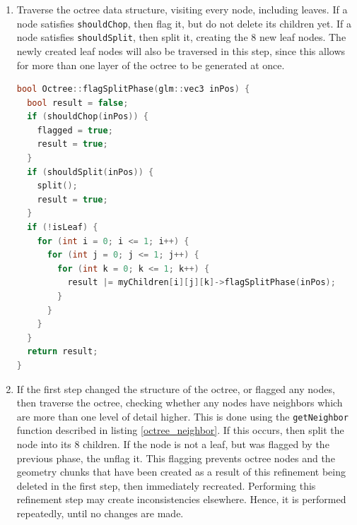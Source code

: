 \documentclass{article}
\begin{document}
\begin{enumerate}
  \item Traverse the octree data structure, visiting every node, including leaves. If a node satisfies \texttt{shouldChop}, then flag it, but do not delete its children yet. If a node satisfies \texttt{shouldSplit}, then split it, creating the 8 new leaf nodes. The newly created leaf nodes will also be traversed in this step, since this allows for more than one layer of the octree to be generated at once.
  
  \begin{lstlisting}[language=C++,label={flagsplitphase},caption={The first stage in the octree refinement process, \texttt{flagSplitPhase}}]
bool Octree::flagSplitPhase(glm::vec3 inPos) {
  bool result = false;
  if (shouldChop(inPos)) {
    flagged = true;
    result = true;
  } 
  if (shouldSplit(inPos)) {
    split();
    result = true;
  }
  if (!isLeaf) {
    for (int i = 0; i <= 1; i++) {
      for (int j = 0; j <= 1; j++) {
        for (int k = 0; k <= 1; k++) {
          result |= myChildren[i][j][k]->flagSplitPhase(inPos);
        }
      }
    }
  }
  return result;
}
  \end{lstlisting}
  \item If the first step changed the structure of the octree, or flagged any nodes, then traverse the octree, checking whether any nodes have neighbors which are more than one level of detail higher. This is done using the \texttt{getNeighbor} function described in listing \ref{octree_neighbor}. If this occurs, then split the node into its 8 children. If the node is not a leaf, but was flagged by the previous phase, the unflag it. This flagging prevents octree nodes and the geometry chunks that have been created as a result of this refinement being deleted in the first step, then immediately recreated. Performing this refinement step may create inconsistencies elsewhere. Hence, it is performed repeatedly, until no changes are made. %
  \begin{lstlisting}[language=C++,label={refinephase},caption={The second stage in the octree refinement process, \texttt{refine}. This phase is called repeatedly until no more changes are made. The array \texttt{edgeNeighbors} corresponds to the relative positions of the neighboring chunks, at the same level of detail, and the variable \texttt{childPosition} gives the position of the child to check in each neighbor. The flow of this code is complicated, and is designed such that exactly the 4 children of the neighboring chunk that touch this chunk are checked.}] 

\end{lstlisting}
\end{enumerate}
\end{document}
